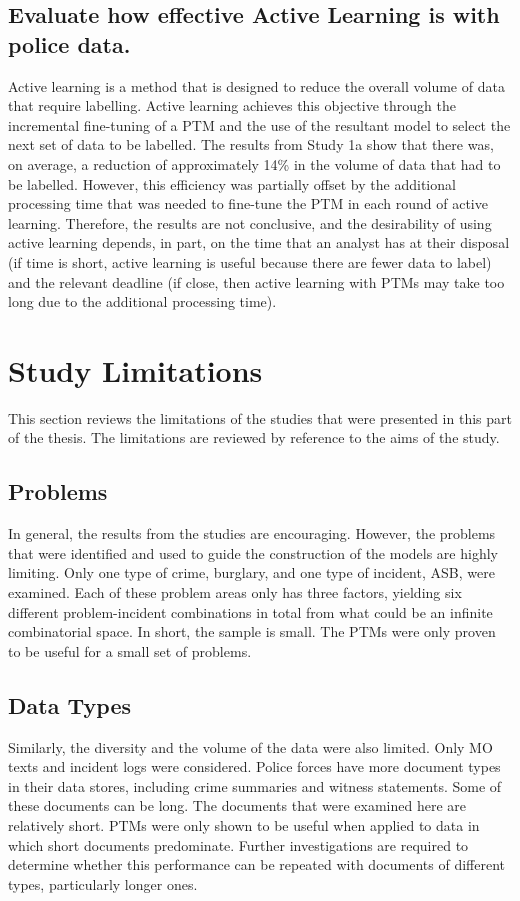 \subsection{Evaluate how effective Active Learning is with police data.}  Active learning is a method that is designed to reduce the overall volume of data that require labelling. Active learning achieves this objective through the incremental fine-tuning of a PTM and the use of the resultant model to select the next set of data to be labelled. The results from Study 1a show that there was, on average, a reduction of approximately 14\% in the volume of data that had to be labelled. However, this efficiency was partially offset by the additional processing time that was needed to fine-tune the PTM in each round of active learning. Therefore, the results are not conclusive, and the desirability of using active learning depends, in part, on the time that an analyst has at their disposal (if time is short, active learning is useful because there are fewer data to label) and the relevant deadline (if close, then active learning with PTMs may take too long due to the additional processing time).

\section{Study Limitations} This section reviews the limitations of the studies that were presented in this part of the thesis. The limitations are reviewed by reference to the aims of the study.

\subsection{Problems} In general, the results from the studies are encouraging. However, the problems that were identified and used to guide the construction of the models are highly limiting. Only one type of crime, burglary, and one type of incident, ASB, were examined. Each of these problem areas only has three factors, yielding six different problem-incident combinations in total from what could be an infinite combinatorial space. In short, the sample is small. The PTMs were only proven to be useful for a small set of problems.

\subsection{Data Types} Similarly, the diversity and the volume of the data were also limited. Only MO texts and incident logs were considered. Police forces have more document types in their data stores, including crime summaries and witness statements. Some of these documents can be long. The documents that were examined here are relatively short. PTMs were only shown to be useful when applied to data in which short documents predominate. Further investigations are required to determine whether this performance can be repeated with documents of different types, particularly longer ones.

